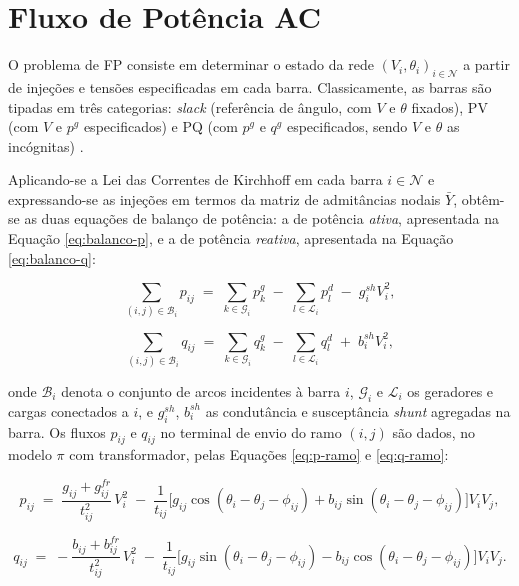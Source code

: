 \section{Fluxo de Potência AC}
\label{sec:fp-ac}

O problema de FP consiste em determinar o estado da rede $(V_i, \theta_i)_{i \in \mathcal{N}}$ a partir de injeções e tensões especificadas em cada barra. Classicamente, as barras são tipadas em três categorias: \textit{slack} (referência de ângulo, com $V$ e $\theta$ fixados), PV (com $V$ e $p^g$ especificados) e PQ (com $p^g$ e $q^g$ especificados, sendo $V$ e $\theta$ as incógnitas) \cite{vonMeier2006powersystems,gloverSarma2012power}.

Aplicando-se a Lei das Correntes de Kirchhoff em cada barra $i \in \mathcal{N}$ e expressando-se as injeções em termos da matriz de admitâncias nodais $\bar{Y}$, obtêm-se as duas equações de balanço de potência: a de potência \textit{ativa}, apresentada na Equação \eqref{eq:balanco-p}, e a de potência \textit{reativa}, apresentada na Equação \eqref{eq:balanco-q}:

\begin{equation}
\label{eq:balanco-p}
\sum_{(i,j) \in \mathcal{B}_i} p_{ij} \;=\; \sum_{k \in \mathcal{G}_i} p^g_k \;-\; \sum_{l \in \mathcal{L}_i} p^d_l \;-\; g^{sh}_i V_i^2,
\end{equation}

\begin{equation}
\label{eq:balanco-q}
\sum_{(i,j) \in \mathcal{B}_i} q_{ij} \;=\; \sum_{k \in \mathcal{G}_i} q^g_k \;-\; \sum_{l \in \mathcal{L}_i} q^d_l \;+\; b^{sh}_i V_i^2,
\end{equation}

\noindent onde $\mathcal{B}_i$ denota o conjunto de arcos incidentes à barra $i$, $\mathcal{G}_i$ e $\mathcal{L}_i$ os geradores e cargas conectados a $i$, e $g^{sh}_i$, $b^{sh}_i$ as condutância e susceptância \textit{shunt} agregadas na barra. Os fluxos $p_{ij}$ e $q_{ij}$ no terminal de envio do ramo $(i,j)$ são dados, no modelo $\pi$ com transformador, pelas Equações \eqref{eq:p-ramo} e \eqref{eq:q-ramo}:

\begin{equation}
\label{eq:p-ramo}
p_{ij} \;=\; \frac{g_{ij} + g^{fr}_{ij}}{t_{ij}^2} \, V_i^2 \;-\; \frac{1}{t_{ij}} \Big[ g_{ij} \cos(\theta_i - \theta_j - \phi_{ij}) + b_{ij} \sin(\theta_i - \theta_j - \phi_{ij}) \Big] V_i V_j,
\end{equation}

\begin{equation}
\label{eq:q-ramo}
q_{ij} \;=\; -\frac{b_{ij} + b^{fr}_{ij}}{t_{ij}^2} \, V_i^2 \;-\; \frac{1}{t_{ij}} \Big[ g_{ij} \sin(\theta_i - \theta_j - \phi_{ij}) - b_{ij} \cos(\theta_i - \theta_j - \phi_{ij}) \Big] V_i V_j.
\end{equation}

